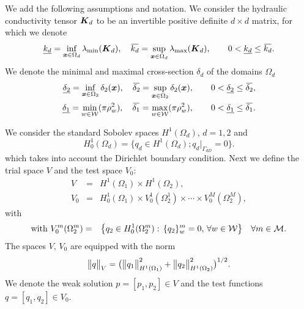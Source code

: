 We add the following assumptions and notation. We consider the hydraulic conductivity tensor $\mathbf{\boldsymbol{K}}_d$
to be an invertible positive definite $d\times d$ matrix, for which we denote
\begin{equation}
    \underline{k_d} = \inf\limits_{\bx\in\Omega_d}\lambda_{\min}(\vc K_d), \quad
    \overbar{k_d}   = \sup\limits_{\bx\in\Omega_d}\lambda_{\max}(\vc K_d), \qquad
     0 < \underline{k_d} \leq \overbar{k_d}.
\end{equation}
We denote the minimal and maximal cross-section $\delta_d$ of the domains $\Omega_d$
\begin{eqnarray}
    \underline{\delta_2} = \inf\limits_{\bx\in\Omega_2} \delta_2(\vc x), \quad
    \overbar{\delta_2}   = \sup\limits_{\bx\in\Omega_2} \delta_2(\vc x), \qquad
     0 < \underline{\delta_2} \leq \overbar{\delta_2},\\
     \underline{\delta_1} = \min\limits_{w\in\mathcal{W}} (\pi\rho_w^2), \quad
    \overbar{\delta_1}    = \max\limits_{w\in\mathcal{W}} (\pi\rho_w^2), \qquad
     0 < \underline{\delta_1} \leq \overbar{\delta_1}.
\end{eqnarray}

We consider the standard Sobolev spaces $H^1(\Omega_d)$, $d=1,2$ and
\[ H^1_0(\Omega_d)=\big\{q_d\in H^1(\Omega_d); q_d|_{\Gamma_{dD}}=0\big\}.
\]
which takes into account the Dirichlet boundary condition.
Next we define the trial space $V$ and the test space $V_0$:
\begin{eqnarray}
  V &=& H^1(\Omega_1)\times H^1(\Omega_2), \label{eqn:prim_weak_space_V}\\
  V_0 &=& H^1_0(\Omega_1)\times V^1_0(\Omega^1_2) \times\cdots\times V^M_0(\Omega^M_2), \label{eqn:prim_weak_space_V0}
\end{eqnarray}
with
\begin{eqnarray}
  \textrm{with } V^m_0(\Omega^m_2) &=& \big\{q_2\in H^1_0(\Omega^m_2):\, \{q_2\}^m_w=0,\,\forall w\in\mathcal{W}\big\}
  \quad \forall m\in\mathcal{M}. \label{eqn:prim_weak_space_Vm0}
\end{eqnarray}
%
The spaces $V,\,V_0$ are equipped with the norm
\begin{equation}
    \bigl\Vert q\bigr\Vert_V = \big( \bigl\Vert q_1\bigr\Vert^2_{H^1(\Omega_1)} + \bigl\Vert q_2\bigr\Vert^2_{H^1(\Omega_2)} \big)^{1/2}.
\end{equation}
We denote the weak solution $p=[p_1,p_2]\in V$ and the test functions $q=[q_1,q_2]\in V_0$.


